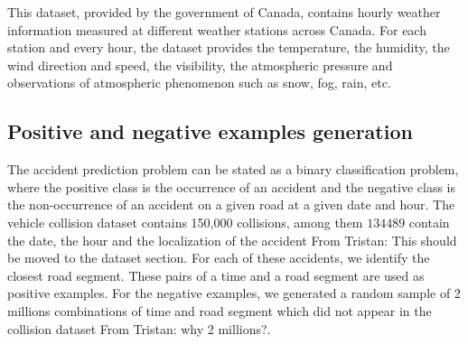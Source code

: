 \documentclass[conference]{IEEEtran}
\newcommand{\TG}[1]{\colorlet{saved}{.}\color{orange}From Tristan: #1\color{saved}}
\begin{document}
This dataset, provided by the government of Canada, contains hourly weather
information measured at different weather stations across Canada. For each
station and every hour, the dataset provides the temperature, the humidity,
the wind direction and speed, the visibility, the atmospheric pressure and
observations of atmospheric phenomenon such as snow, fog, rain, etc.

\subsection{Positive and negative examples generation}

The accident prediction problem can be stated as a binary classification
problem, where the positive class is the occurrence of an accident and the
negative class is the non-occurrence of an accident on a given road at a
given date and hour. The vehicle collision dataset contains 150,000
collisions, among them $134 489$ contain the date, the hour and the
localization of the accident \TG{This should be moved to the dataset section}.  For each of these accidents, we identify the
closest road segment. These pairs of a time and a road segment are used as
positive examples. For the negative examples, we generated a random sample
of 2 millions combinations of time and road segment which did not appear in
the collision dataset \TG{why 2 millions?}.
\end{document}

